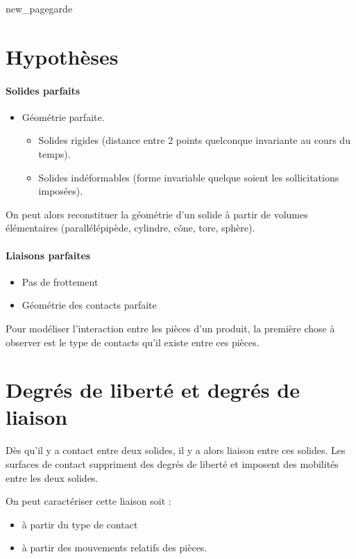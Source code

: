 \documentclass[10pt,fleqn]{article} %
\begin{document}
{new_pagegarde}
\section{Hypothèses}
\paragraph{Solides parfaits}
\begin{itemize}
    \item Géométrie parfaite.
    \begin{itemize}
        \item Solides rigides (distance entre 2 points quelconque invariante au cours du temps).
        \item Solides indéformables (forme invariable quelque soient les sollicitations imposées).
    \end{itemize}
\end{itemize}
On peut alors reconstituer la géométrie d'un solide à partir de volumes élémentaires (parallélépipède, cylindre, cône, tore, sphère).

\paragraph{Liaisons parfaites}
\begin{itemize}
    \item Pas de frottement
    \item Géométrie des contacts parfaite
\end{itemize}
Pour modéliser l'interaction entre les pièces d'un produit, la première chose à observer est le type de contacts qu'il existe entre ces pièces.

\section{Degrés de liberté et degrés de liaison}
Dès qu'il y a contact entre deux solides, il y a alors
liaison entre ces solides. Les surfaces de contact suppriment des degrés de liberté et imposent des mobilités entre les deux solides.

On peut caractériser cette liaison soit :
\begin{itemize}
    \item à partir du type de contact
    \item à partir des mouvements relatifs des pièces.
\end{itemize}
\end{document}
